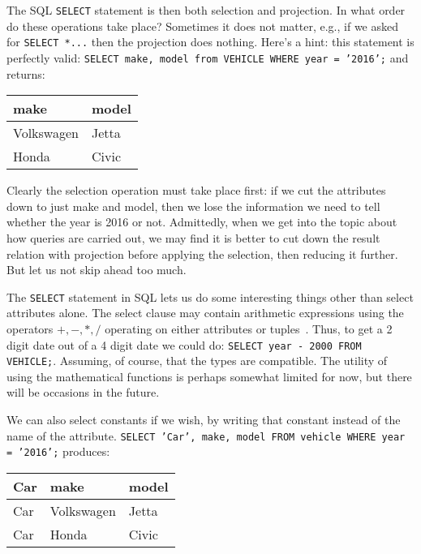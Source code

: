 \documentclass[a4paper]{report}
\begin{document}
The SQL \texttt{SELECT} statement is then both selection and projection. In what order do these operations take place? Sometimes it does not matter, e.g., if we asked for \texttt{SELECT *...} then the projection does nothing. Here's a hint: this statement is perfectly valid: \texttt{SELECT make, model from VEHICLE WHERE year = '2016';} and returns: 

\begin{center}
\begin{tabular}{|l|l|} \hline
\textbf{make} & \textbf{model} \\ \hline
	Volkswagen & Jetta  \\ \hline
	Honda & Civic \\ \hline
\end{tabular}
\end{center}

Clearly the selection operation must take place first: if we cut the attributes down to just make and model, then we lose the information we need to tell whether the year is 2016 or not. Admittedly, when we get into the topic about how queries are carried out, we may find it is better to cut down the result relation with projection before applying the selection, then reducing it further. But let us not skip ahead too much.  

The \texttt{SELECT} statement in SQL lets us do some interesting things other than select attributes alone. The select clause may contain arithmetic expressions using the operators $+, -, *, /$ operating on either attributes or tuples~\cite{dsc}. Thus, to get a 2 digit date out of a 4 digit date we could do: \texttt{SELECT year - 2000 FROM VEHICLE;}. Assuming, of course, that the types are compatible. The utility of using the mathematical functions is perhaps somewhat limited for now, but there will be occasions in the future. 

We can also select constants if we wish, by writing that constant instead of the name of the attribute. \texttt{SELECT 'Car', make, model FROM vehicle WHERE year = '2016';} produces:

\begin{center}
\begin{tabular}{|l|l|l|} \hline
\textbf{Car} & \textbf{make} & \textbf{model} \\ \hline
	Car & Volkswagen & Jetta  \\ \hline
	Car &Honda & Civic \\ \hline
\end{tabular}
\end{center}
\end{document}
